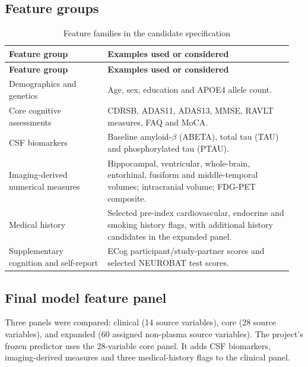 \documentclass[11pt,a4paper]{article}
\begin{document}
\subsection{Feature groups}
\begingroup\small\renewcommand{\arraystretch}{1.16}
\begin{longtable}{@{}>{\raggedright\arraybackslash}p{0.33\linewidth}>{\raggedright\arraybackslash}p{0.62\linewidth}@{}}
\caption{Feature families in the candidate specification}\\
\toprule \textbf{Feature group} & \textbf{Examples used or considered}\\\midrule\endfirsthead
\toprule \textbf{Feature group} & \textbf{Examples used or considered}\\\midrule\endhead
\midrule\endfoot\bottomrule\endlastfoot
Demographics and genetics & Age, sex, education and APOE4 allele count.\\
Core cognitive assessments & CDRSB, ADAS11, ADAS13, MMSE, RAVLT measures, FAQ and MoCA.\\
CSF biomarkers & Baseline amyloid-\ensuremath{\beta} (ABETA), total tau (TAU) and phosphorylated tau (PTAU).\\
Imaging-derived numerical measures & Hippocampal, ventricular, whole-brain, entorhinal, fusiform and middle-temporal volumes; intracranial volume; FDG-PET composite.\\
Medical history & Selected pre-index cardiovascular, endocrine and smoking history flags, with additional history candidates in the expanded panel.\\
Supplementary cognition and self-report & ECog participant/study-partner scores and selected NEUROBAT test scores.\\
\end{longtable}\endgroup
\subsection{Final model feature panel}
Three panels were compared: clinical (14 source variables), core (28 source variables), and expanded (60 assigned non-plasma source variables). The project's frozen predictor uses the 28-variable core panel. It adds CSF biomarkers, imaging-derived measures and three medical-history flags to the clinical panel.
\end{document}
